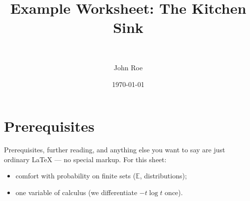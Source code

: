 \documentclass[11pt]{article}
\title{Example Worksheet: The Kitchen Sink}
\author{\authorname{Jane Doe}\\ \affiliation{Example University}
  \and John Roe}
\date{\today}
\newcommand{\E}{\mathbb{E}}
\begin{document}
\maketitle



\section{Prerequisites}
\label{sec:prereqs}

Prerequisites, further reading, and anything else you want to say are just
ordinary \LaTeX{} — no special markup. For this sheet:
\begin{itemize}
  \item comfort with probability on finite sets ($\E$, distributions);
  \item one variable of calculus (we differentiate $-t \log t$ once).
\end{itemize}
\end{document}
